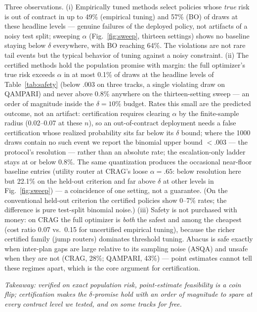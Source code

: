 Three observations. (i) Empirically tuned methods select policies whose
\emph{true} risk is out of contract in up to 49\% (empirical tuning) and
57\% (BO) of draws at these headline levels
--- genuine failures of the deployed policy, not artifacts of a
noisy test split; sweeping $\alpha$ (Fig.~\ref{fig:sweep}, thirteen
settings) shows no baseline staying below $\delta$ everywhere, with BO
reaching 64\%. The violations are not rare tail events but the typical
behavior of tuning against a noisy constraint. (ii) The certified methods
hold the population promise with margin: the full optimizer's true risk
exceeds $\alpha$ in at most 0.1\% of draws at the headline levels of
Table~\ref{tab:safety} (below $.003$ on three tracks, a single
violating draw on QAMPARI) and
never above 0.8\% anywhere on the
thirteen-setting sweep --- an order of magnitude inside the
$\delta=10\%$ budget. Rates this small are the predicted outcome, not
an artifact: certification requires clearing $\alpha$ by the
finite-sample radius (0.02--0.07 at these $n$), so an out-of-contract
deployment needs a false certification whose realized probability sits
far below its $\delta$ bound; where the 1000 draws contain no such
event we report the binomial upper bound $<.003$ --- the protocol's
resolution --- rather than an absolute rate; the escalation-only
ladder stays at or below 0.8\%. The same quantization produces the occasional near-floor
baseline entries
(utility router at CRAG's loose $\alpha = .65$: below resolution here
but 22.1\%
on the held-out criterion and far above $\delta$ at other levels in
Fig.~\ref{fig:sweep}) --- a coincidence of one setting, not a
guarantee. (On the conventional held-out criterion the certified
policies show
0--7\% rates; the difference is pure test-split binomial noise.)
(iii) Safety
is not purchased with money: on CRAG the full optimizer is \emph{both} the
safest and among the cheapest (cost ratio 0.07 vs.\ 0.15 for uncertified
empirical tuning), because the richer certified family (jump routers)
dominates threshold tuning. Abacus is safe exactly when inter-plan gaps
are large relative to its sampling noise (ASQA) and unsafe when they are
not (CRAG, 28\%; QAMPARI, 43\%) --- point estimates cannot tell these
regimes apart, which is the core argument for certification.

\smallskip\noindent\textit{Takeaway: verified on exact population risk,
point-estimate feasibility is a coin flip; certification makes the
$\delta$-promise hold with an order of magnitude to spare at every
contract level we tested, and on some tracks for free.}

